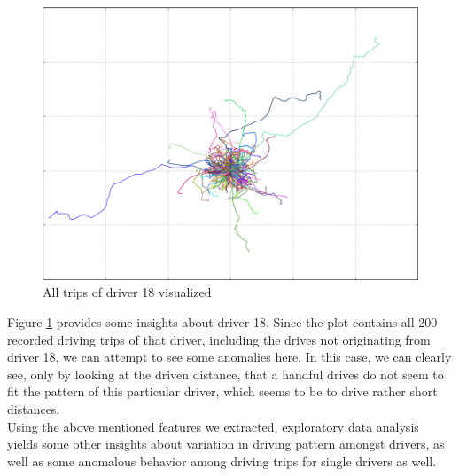 \documentclass{vldb}
\begin{document}
\begin{figure}
\centering
\includegraphics[width= 1\linewidth]{"pics/all_drives_18"}%
\caption{All trips of driver 18 visualized}
\label{fig:driver-18}
\end{figure}
Figure \ref{fig:driver-18} provides some insights about driver 18. Since the plot contains all 200 recorded driving trips of that driver, including the drives not originating from driver 18, we can attempt to see some anomalies here. In this case, we can clearly see, only by looking at the driven distance, that a handful drives do not seem to fit the pattern of  this particular driver, which seems to be to drive rather short distances.\\
Using the above mentioned features we extracted, exploratory data analysis yields some other insights about variation in driving pattern amongst drivers, as well as some anomalous behavior among driving trips for single drivers as well.
 
\end{document}
